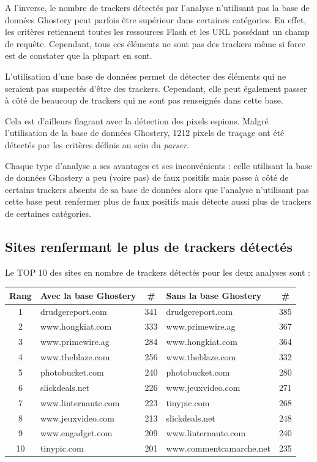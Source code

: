 A l'inverse, le nombre de trackers détectés par l'analyse n'utilisant pas la base de données Ghostery peut parfois être supérieur dans certaines catégories. En effet, les critères retiennent toutes les ressources Flash et les URL possédant un champ de requête. Cependant, tous ces éléments ne sont pas des trackers même si force est de constater que la plupart en sont.
\newline

L'utilisation d'une base de données permet de détecter des éléments qui ne seraient pas suspectés d'être des trackers. Cependant, elle peut également passer à côté de beaucoup de trackers qui ne sont pas renseignés dans cette base.

Cela est d'ailleurs flagrant avec la détection des pixels espions. Malgré l'utilisation de la base de données Ghostery, 1212 pixels de traçage ont été détectés par les critères définis au sein du \textit{parser}.
\newline

Chaque type d'analyse a ses avantages et ses inconvénients : celle utilisant la base de données Ghostery a peu (voire pas) de faux positifs mais passe à côté de certains trackers absents de sa base de données alors que l'analyse n'utilisant pas cette base peut renfermer plus de faux positifs mais détecte aussi plus de trackers de certaines catégories.

\subsection{Sites renfermant le plus de trackers détectés}
Le TOP 10 des sites en nombre de trackers détectés pour les deux analyses sont :\\

\begin{tabular}{ c | p{5cm} | c || p{5cm} | c | }
   Rang & Avec la base Ghostery & \# & Sans la base Ghostery & \# \\
   \hline
   1 & drudgereport.com & 341 & drudgereport.com & 385\\
   2 & www.hongkiat.com & 333 & www.primewire.ag & 367\\
   3 & www.primewire.ag & 284 & www.hongkiat.com & 364\\
   4 & www.theblaze.com & 256 & www.theblaze.com & 332\\
   5 & photobucket.com & 240 & photobucket.com & 280\\
   6 & slickdeals.net & 226 & www.jeuxvideo.com & 271\\
   7 & www.linternaute.com & 223 & tinypic.com & 268\\
   8 & www.jeuxvideo.com & 213 & slickdeals.net & 248\\
   9 & www.engadget.com & 209 & www.linternaute.com & 240\\
   10 & tinypic.com & 201 & www.commentcamarche.net & 235\\
   \hline
\end{tabular}
\newline

